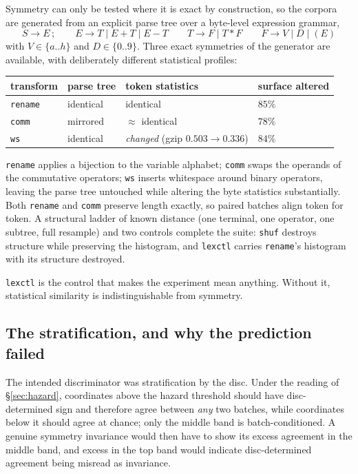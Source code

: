 Symmetry can only be tested where it is exact by construction, so the corpora
are generated from an explicit parse tree over a byte-level expression
grammar,
\[
S\to E\,;\qquad E\to T \mid E{+}T \mid E{-}T \qquad T\to F\mid T{*}F
\qquad F\to V\mid D\mid (E)
\]
with $V\in\{a..h\}$ and $D\in\{0..9\}$. Three exact symmetries of the
generator are available, with deliberately different statistical profiles:

\begin{center}
\begin{tabular}{llll}
\hline
transform & parse tree & token statistics & surface altered \\
\hline
\texttt{rename} & identical & identical      & $85\%$ \\
\texttt{comm}   & mirrored  & $\approx$ identical & $78\%$ \\
\texttt{ws}     & identical & \emph{changed} (gzip $0.503\to0.336$) & $84\%$ \\
\hline
\end{tabular}
\end{center}

\texttt{rename} applies a bijection to the variable alphabet; \texttt{comm}
swaps the operands of the commutative operators; \texttt{ws} inserts
whitespace around binary operators, leaving the parse tree untouched while
altering the byte statistics substantially. Both \texttt{rename} and
\texttt{comm} preserve length exactly, so paired batches align token for
token. A structural ladder of known distance (one terminal, one operator, one
subtree, full resample) and two controls complete the suite: \texttt{shuf}
destroys structure while preserving the histogram, and \texttt{lexctl} carries
\texttt{rename}'s histogram with its structure destroyed.

\texttt{lexctl} is the control that makes the experiment mean anything. Without
it, statistical similarity is indistinguishable from symmetry.

\subsection{The stratification, and why the prediction failed}
\label{sec:rstrat}

The intended discriminator was stratification by the disc. Under the reading of
\S\ref{sec:hazard}, coordinates above the hazard threshold should have
disc-determined sign and therefore agree between \emph{any} two batches, while
coordinates below it should agree at chance; only the middle band is
batch-conditioned. A genuine symmetry invariance would then have to show its
excess agreement in the middle band, and excess in the top band would indicate
disc-determined agreement being misread as invariance.

